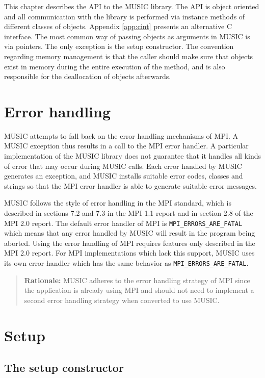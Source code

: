\documentclass[a4paper,twoside]{report}
\newenvironment{rationale}%
{\par\begin{quote}\textbf{Rationale:}}%
{\par\end{quote}}
\begin{document}
This chapter describes the API to the MUSIC library.  The API is
object oriented and all communication with the library is performed
via instance methods of different classes of objects.  Appendix
\ref{app:cint} presents an alternative C interface.  The most common
way of passing objects as arguments in MUSIC is via pointers.  The
only exception is the setup constructor.  The convention regarding
memory management is that the caller should make sure that objects
exist in memory during the entire execution of the method, and is also
responsible for the deallocation of objects afterwards.


\section{Error handling}

MUSIC attempts to fall back on the error handling mechanisms of MPI.
A MUSIC exception thus results in a call to the MPI error handler.
A particular implementation of the MUSIC library does not guarantee
that it handles all kinds of error that may occur during MUSIC calls.
Each error handled by MUSIC generates an exception, and MUSIC installs
suitable error codes, classes and strings so that the MPI error
handler is able to generate suitable error messages.

MUSIC follows the style of error handling in the MPI standard, which
is described in sections 7.2 and 7.3 in the MPI 1.1
report\cite{mpi1.1} and in section 2.8 of the MPI 2.0
report\cite{mpi2.0}.  The default error handler of MPI is
\lstinline|MPI_ERRORS_ARE_FATAL| which means that any error handled by
MUSIC will result in the program being aborted.  Using the error
handling of MPI requires features only described in the MPI 2.0
report.  For MPI implementations which lack this support, MUSIC uses
its own error handler which has the same behavior as
\lstinline|MPI_ERRORS_ARE_FATAL|.

\begin{rationale}
  MUSIC adheres to the error handling strategy of MPI since the
  application is already using MPI and should not need to implement a
  second error handling strategy when converted to use MUSIC.
\end{rationale}

\section{Setup}

\subsection{The setup constructor}
\end{document}
